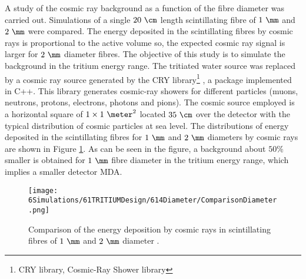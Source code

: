 A study of the cosmic ray background as a function of the fibre diameter was carried out. Simulations of a single $20~\cm$ length scintillating fibre of $1~\mm$ and $2~\mm$ were compared. The energy deposited in the scintillating fibres by cosmic rays is proportional to the active volume so, the expected cosmic ray signal is larger for $2~\mm$ diameter fibres. The objective of this study is to simulate the background in the tritium energy range. The tritiated water source was replaced by a cosmic ray source generated by the CRY library\footnote{CRY library, Cosmic-Ray Shower library} \cite{CRYwebsite, CRYpaper}, a package implemented in C++. This library generates cosmic-ray showers for different particles (muons, neutrons, protons, electrons, photons and pions). The cosmic source employed is a horizontal square of $1 \times 1~\meter ^2$ located $35~\cm$ over the detector with the typical distribution of cosmic particles at sea level. The distributions of energy deposited in the scintillating fibres for $1~\mm$ and $2~\mm$ diameters by cosmic rays are shown in Figure \ref{fig:DiameterComparison}. As can be seen in the figure, a background about $50\%$ smaller is obtained for $1~\mm$ fibre diameter in the tritium energy range, which implies a smaller detector MDA. %

\begin{figure}[hbtp]
\centering
\texttt{[image: 6Simulations/61TRITIUMDesign/614Diameter/ComparisonDiameter.png]}
\caption{Comparison of the energy deposition by cosmic rays in scintillating fibres of $1~\mm$ and $2~\mm$ diameter \cite{SimulationPaperCarlos}.\label{fig:DiameterComparison}}
\end{figure}